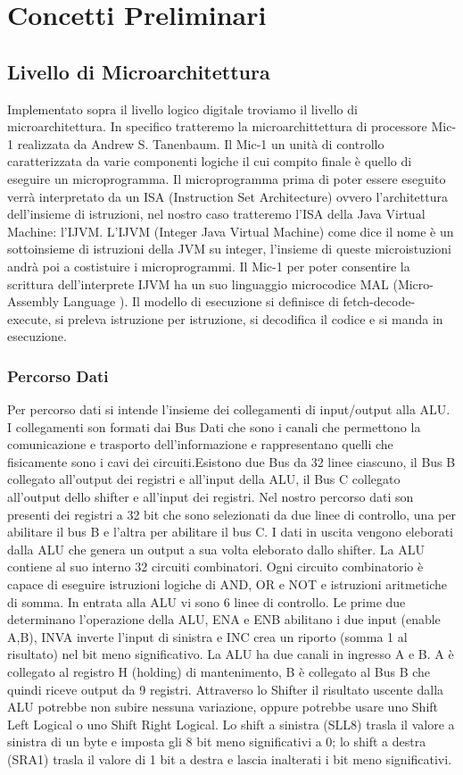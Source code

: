 \chapter{Concetti Preliminari}
\section{Livello di Microarchitettura}
Implementato sopra il livello logico digitale troviamo il livello di microarchitettura.
In specifico tratteremo la microarchittettura di processore Mic-1 realizzata da Andrew S. Tanenbaum.
Il Mic-1 un unità di controllo caratterizzata da varie componenti logiche il cui compito finale è quello di eseguire un microprogramma. Il microprogramma prima di poter essere eseguito verrà interpretato da un ISA (Instruction Set Architecture) ovvero l'architettura dell'insieme di istruzioni, nel nostro caso  tratteremo l'ISA della Java Virtual Machine: l'IJVM. L'IJVM (Integer Java Virtual Machine) come dice il nome è un sottoinsieme di istruzioni della JVM su integer, l'insieme di queste microistuzioni andrà poi a costistuire i microprogrammi. Il Mic-1 per poter consentire la scrittura dell'interprete IJVM ha un suo linguaggio microcodice MAL (Micro-Assembly Language ). Il modello di esecuzione si definisce di fetch-decode-execute, si preleva istruzione per istruzione, si decodifica il codice e si manda in esecuzione.
\subsection{Percorso Dati}
Per percorso dati si intende l'insieme dei collegamenti di input/output alla ALU. I collegamenti son formati dai Bus Dati che sono i canali che permettono la comunicazione e trasporto dell'informazione e rappresentano quelli che fisicamente sono i cavi dei circuiti.Esistono due Bus da 32 linee ciascuno, il Bus B collegato all'output dei registri e all'input della ALU, il Bus C collegato all'output dello shifter e all'input dei registri. Nel nostro percorso dati son presenti dei registri a 32 bit che sono selezionati da due linee di controllo, una per abilitare il bus B e l'altra per abilitare il bus C. I dati in uscita vengono eleborati dalla ALU che genera un output a sua volta eleborato dallo shifter. La ALU contiene al suo interno 32 circuiti combinatori. Ogni circuito combinatorio è capace di eseguire istruzioni logiche di AND, OR e NOT e istruzioni aritmetiche di somma. In entrata alla ALU vi sono 6 linee di controllo. Le prime due determinano l'operazione della ALU, ENA e ENB abilitano i due input (enable A,B), INVA inverte l'input di sinistra e INC crea un riporto (somma 1 al risultato) nel bit meno significativo. La ALU ha due canali in ingresso A e B.
A è collegato al registro H (holding) di mantenimento, B è collegato al Bus B che quindi riceve output da 9 registri. Attraverso lo Shifter il risultato uscente dalla ALU potrebbe non subire nessuna variazione, oppure	potrebbe usare uno Shift Left Logical o uno Shift Right Logical. Lo shift a sinistra (SLL8) trasla il valore a sinistra di un byte e imposta gli 8 bit meno significativi a 0; lo shift a destra (SRA1) trasla il valore di 1 bit a destra e lascia inalterati i bit meno significativi.
